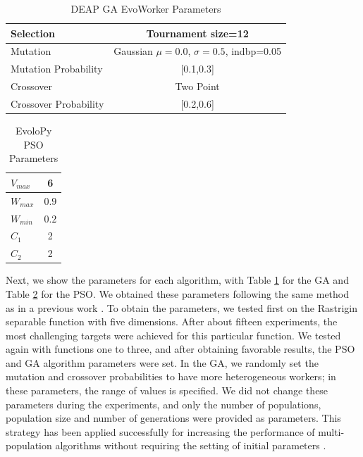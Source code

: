 \documentclass[review]{elsarticle}
\begin{document}
\begin{table}[h!tbp]
  \small
  \caption{DEAP GA EvoWorker Parameters }
  \label{tab:GAparams} 
  \centering
  \small
  \begin{tabular}{|l|c|}
    \hline
    Selection & Tournament size=12                            \\ \hline
    Mutation & Gaussian $\mu=0.0$, $\sigma=0.5$, indbp=0.05   \\ \hline
    Mutation Probability & [0.1,0.3]                          \\ \hline
    Crossover & Two Point                                     \\ \hline
    Crossover Probability  & [0.2,0.6]                          \\ \hline
  \end{tabular}
\end{table}
%
\begin{table}[h!tbp]
  \small
  \caption{ EvoloPy PSO Parameters }
  \label{tab:PSOparams} 
  \centering
  \small
  \begin{tabular}{|l|c|}
    \hline
    $V_{max}$ & 6 \\ \hline
    $W_{max}$ & $0.9$ \\ \hline
    $W_{min}$ & $0.2$ \\ \hline
    $C_1$ & 2 \\ \hline
    $C_2$ & 2 \\ \hline
  \end{tabular}
\end{table}

Next, we show the parameters for each algorithm, with Table \ref{tab:GAparams} for
the GA and Table \ref{tab:PSOparams} for the PSO. We obtained these parameters
following the same method as in a previous work \cite{garcia2017benchmarking}.
To obtain the parameters, we tested first on the Rastrigin separable function
with five dimensions. After about fifteen experiments, the most challenging
targets were achieved for this particular function. We tested again with
functions one to three, and after obtaining favorable results, the PSO and GA
algorithm parameters were set. In the GA, we randomly set the mutation and
crossover probabilities to have more heterogeneous workers; 
in these parameters, the range of values is specified. We did not change these parameters during the 
experiments, and only the number of populations, population size and number of generations were
provided as parameters. This strategy has been applied successfully for increasing 
the performance of multi-population algorithms without requiring the setting 
of initial parameters \cite{garcia2014randomized}.
\end{document}
